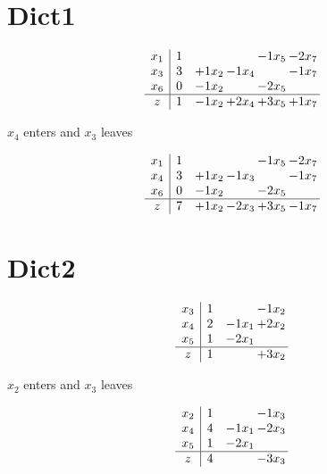 \documentclass[12pt]{article}
\begin{document}
\section{Dict1}

\[\begin{array}{c| c c@{\hskip 2pt} c@{\hskip 2pt} c@{\hskip 2pt} c@{\hskip 2pt} }
 x_1   &  1  &    &   & -1 x_5 & -2 x_7\\
 x_3   &  3 & + 1 x_2 & -1 x_4 &   & -1 x_7\\
 x_6   &  0 & -1 x_2 &   & -2 x_5 &   \\
\hline
z    &  1 & -1 x_2 & + 2 x_4 & + 3 x_5 & + 1 x_7\\
\end{array}\]


 $ x_4 $ enters and $ x_3 $ leaves 

 \[\begin{array}{c| c c@{\hskip 2pt} c@{\hskip 2pt} c@{\hskip 2pt} c@{\hskip 2pt} }
 x_1   &  1  &    &   & -1 x_5 & -2 x_7\\
 x_4   &  3 & + 1 x_2 & -1 x_3 &   & -1 x_7\\
 x_6   &  0 & -1 x_2 &   & -2 x_5 &   \\
\hline
z    &  7 & + 1 x_2 & -2 x_3 & + 3 x_5 & -1 x_7\\
\end{array}\]

\section{Dict2}
\[\begin{array}{c| c c@{\hskip 2pt} c@{\hskip 2pt} }
 x_3   &  1  &   & -1 x_2\\
 x_4   &  2 & -1 x_1 & + 2 x_2\\
 x_5   &  1 & -2 x_1 &   \\
\hline
z    &  1  &   & + 3 x_2\\
\end{array}\]


 $ x_2 $ enters and $ x_3 $ leaves 

 \[\begin{array}{c| c c@{\hskip 2pt} c@{\hskip 2pt} }
 x_2   &  1  &   & -1 x_3\\
 x_4   &  4 & -1 x_1 & -2 x_3\\
 x_5   &  1 & -2 x_1 &   \\
\hline
z    &  4  &   & -3 x_3\\
\end{array}\]
\end{document}
